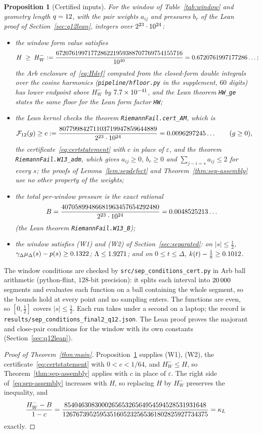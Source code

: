 \documentclass[11pt]{article}
\newtheorem{proposition}[theorem]{Proposition}
\theoremstyle{definition}
\newcommand{\Fr}{\mathcal{F}}
\newcommand{\eps}{\varepsilon}
\begin{document}
\begin{proposition}[Certified inputs]\label{prop:inputs}
For the window of Table~\ref{tab:window} and geometry length $q=12$, with the
pair weights $a_{ij}$ and pressures $b_r$ of the Lean proof of
Section~\ref{sec:q12lean}, integers over $2^{23}\cdot10^{24}$:
\begin{itemize}
\item the window form value satisfies
\[
  H\;\ge\;H_W^-:=\frac{6720761997177286221959388707769754155716}{10^{40}}=0.6720761997177286\ldots;
\]
the Arb enclosure of~\eqref{eq:Hdef} computed from the closed-form double
integrals over the cosine harmonics (\texttt{pipeline/hfloor.py} in the supplement,
$60$ digits) has lower endpoint above $H_W^-$ by $7.7\times10^{-41}$, and the Lean theorem \texttt{HW\_ge} states the same floor for
the Lean form factor \texttt{HW};
\item the Lean kernel checks the theorem \texttt{RiemannFail.cert\_AM}, which
is
\[
  \Fr_{\qQ}(g)\ge c:=\frac{\qcNum}{\qScale}=\qc\ldots
  \qquad(g\ge0),
\]
the certificate~\eqref{eq:certstatement} with $c$ in place of $\eps$, and the
theorem \texttt{RiemannFail.W13\_adm}, which gives $a_{ij}\ge0$, $b_r\ge0$ and
$\sum_{j-i=s}a_{ij}\le2$ for every $s$; the proofs of
Lemma~\ref{lem:sepdefect} and Theorem~\ref{thm:sep-assembly} use no other
property of the weights;
\item the total per-window pressure is the exact rational
\[
  B=\frac{40705899486681963457654292480}{2^{23}\cdot10^{24}}=0.0048525213\ldots
\]
(the Lean theorem \texttt{RiemannFail.W13\_B});
\item the window satisfies (W1) and (W2) of Section~\ref{sec:separated}:
on $|s|\le\tfrac12$, $\gamma_\Delta\mu_\Delta(s)-p(s)\ge0.1322$;
$\Lambda\le1.9271$; and on $0\le t\le\Delta$,
$k(t)-\tfrac18\ge0.1012$.
\end{itemize}
\end{proposition}

The window conditions are checked by
\texttt{src/sep\_conditions\_cert.py} in Arb ball arithmetic (python-flint,
$128$-bit precision): it splits each interval into $20\,000$ segments
and evaluates each function on a ball containing the whole segment, so the
bounds hold at every point and no sampling enters. The functions are even, so
$[0,\tfrac12]$ covers $|s|\le\tfrac12$. Each run takes under a second on a
laptop; the record is \texttt{results/sep\_conditions\_final2\_q12.json}. The
Lean proof proves the majorant and close-pair conditions for the window with
its own constants (Section~\ref{sec:q12lean}).

\begin{proof}[Proof of Theorem~\ref{thm:main}]
Proposition~\ref{prop:inputs} supplies (W1), (W2), the
certificate~\eqref{eq:certstatement} with $0<c<1/64$, and $H_W^-\le H$, so
Theorem~\ref{thm:sep-assembly} applies with $c$ in place of $\eps$. The right
side of~\eqref{eq:sep-assembly} increases with $H$, so replacing $H$ by
$H_W^-$ preserves the inequality, and
\[
  \frac{H_W^--B}{1-c}=\frac{854046308300026565326564954594528531931648}{1267673952595351605232565361802825927734375}=\kappa_L
\]
exactly.
\end{proof}
\end{document}
